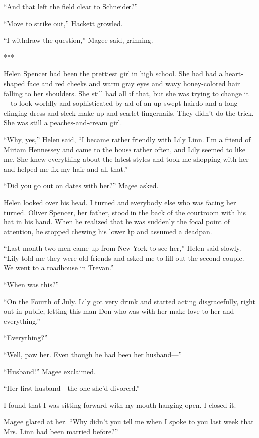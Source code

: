 \documentclass{novel}
\begin{document}
{“And that left the field clear to Schneider?”

“Move to strike out,” Hackett growled.

“I withdraw the question,” Magee said, grinning.

***

Helen Spencer had been the prettiest girl in high school. She had had a heart-shaped face and red cheeks and warm gray eyes and wavy honey-colored hair falling to her shoulders. She still had all of that, but she was trying to change it—to look worldly and sophisticated by aid of an up-swept hairdo and a long clinging dress and sleek make-up and scarlet fingernails. They didn’t do the trick. She was still a peaches-and-cream girl.

“Why, yes,” Helen said, “I became rather friendly with Lily Linn. I’m a friend of Miriam Hennessey and came to the house rather often, and Lily seemed to like me. She knew everything about the latest styles and took me shopping with her and helped me fix my hair and all that.”

“Did you go out on dates with her?” Magee asked.

Helen looked over his head. I turned and everybody else who was facing her turned. Oliver Spencer, her father, stood in the back of the courtroom with his hat in his hand. When he realized that he was suddenly the focal point of attention, he stopped chewing his lower lip and assumed a deadpan.

“Last month two men came up from New York to see her,” Helen said slowly. “Lily told me they were old friends and asked me to fill out the second couple. We went to a roadhouse in Trevan.”

“When was this?”

“On the Fourth of July. Lily got very drunk and started acting disgracefully, right out in public, letting this man Don who was with her make love to her and everything.”

“Everything?”

“Well, paw her. Even though he had been her husband—”

“Husband!” Magee exclaimed.

“Her first husband—the one she’d divorced.”

I found that I was sitting forward with my mouth hanging open. I closed it.

Magee glared at her. “Why didn’t you tell me when I spoke to you last week that Mrs. Linn had been married before?”

}
\end{document}
